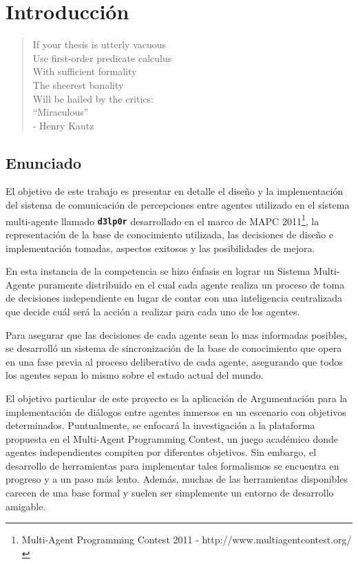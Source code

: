 \chapter{Introducción}
\label{chap:introduccion}

\begin{quote}
\scriptsize{
If your thesis is utterly vacuous   \\
Use first-order predicate calculus  \\
    With sufficient formality       \\
    The sheerest banality           \\
Will be hailed by the critics:      \\
    ``Miraculous''                  \\

- Henry Kautz
}
\end{quote}

\section{Enunciado}
\label{sec:enunciado}

 El objetivo de este trabajo es presentar en detalle el diseño y la 
 implementación del sistema de comunicación de percepciones entre 
 agentes utilizado en el sistema multi-agente llamado 
 \texttt{\textbf{d3lp0r}} desarrollado en el marco 
 de MAPC 2011\footnote{Multi-Agent Programming Contest 2011 - 
 http://www.multiagentcontest.org/},
 la representación de la base de conocimiento utilizada, las decisiones
 de diseño e implementación tomadas, aspectos exitosos y las
 posibilidades de mejora.
 
 En esta instancia de la competencia se hizo énfasis en lograr un
 Sistema Multi-Agente puramente distribuido en el cual cada agente
 realiza un proceso de toma de decisiones independiente en lugar de
 contar con una inteligencia centralizada que decide cuál será la
 acción a realizar para cada uno de los agentes. 
 
 Para asegurar que las decisiones de cada agente sean lo mas informadas
 posibles, se desarrolló un sistema de sincronización de la base de
 conocimiento que opera en una fase previa al proceso deliberativo de
 cada agente, asegurando que todos los agentes sepan lo mismo sobre el
 estado actual del mundo.
 
 El objetivo particular de este proyecto es la aplicación de
 Argumentación para la implementación de diálogos entre agentes
 inmersos en un escenario con objetivos determinados.
 Puntualmente, se enfocará la investigación a la plataforma propuesta
 en el Multi-Agent Programming Contest, un juego académico donde
 agentes independientes compiten por diferentes objetivos.
 Sin embargo, el desarrollo de herramientas para implementar tales
 formalismos se encuentra en progreso y a un paso más lento.
 Además, muchas de las herramientas disponibles carecen de una base
 formal y suelen ser simplemente un entorno de desarrollo amigable.

